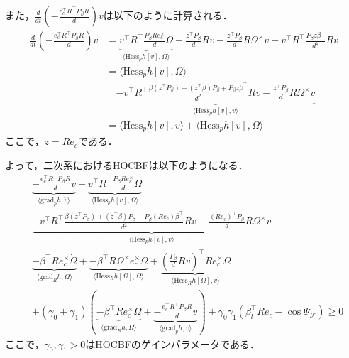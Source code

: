 また，$\frac{d}{dt} \left( -\frac{e_c^\top R^\top P_\beta R}{d} \right) v$は以下のように計算される．
\begin{equation}
\begin{aligned}
\frac{d}{dt} \left( -\frac{e_c^\top R^\top P_\beta R}{d} \right) v &= \underbrace{v^\top R^\top \frac{P_\beta R e_c^\times}{d} \Omega}_{\langle \mathrm{Hess}_p h[v], \Omega \rangle} - \frac{z^\top \dot{P}_\beta}{d} R v - \frac{z^\top P_\beta}{d} R \Omega^\times v - v^\top R^\top \frac{P_\beta z \beta^\top}{d^2} R v \\
&= \langle \mathrm{Hess}_p h[v], \Omega \rangle \\
&\quad \underbrace{-v^\top R^\top \frac{\beta (z^\top P_\beta) + (z^\top \beta) P_\beta + P_\beta z \beta^\top}{d^2} R v - \frac{z^\top P_\beta}{d} R \Omega^\times v}_{\langle \mathrm{Hess}_p h[v], v \rangle} \\
&= \langle \mathrm{Hess}_p h[v], v \rangle + \langle \mathrm{Hess}_p h[v], \Omega \rangle
\label{eq:hess_p_h_v_v}
\end{aligned}
\end{equation}
ここで，$z = R e_c$である．

よって，二次系におけるHOCBFは以下のようになる．
\begin{equation}
\begin{aligned}
&\underbrace{-\frac{e_c^\top R^\top P_\beta R}{d} \dot{v}}_{\langle \mathrm{grad}_p h, \dot{v} \rangle} + \underbrace{v^\top R^\top \frac{P_\beta R e_c^\times}{d} \Omega}_{\langle \mathrm{Hess}_p h[v], \Omega \rangle} \\
&\underbrace{-v^\top R^\top \frac{\beta (z^\top P_\beta) + (z^\top \beta) P_\beta + P_\beta (R e_c) \beta^\top}{d^2} R v - \frac{(R e_c)^\top P_\beta}{d} R \Omega^\times v}_{\langle \mathrm{Hess}_p h[v], v \rangle} \\
&\underbrace{-\beta^\top R e_c^\times \dot{\Omega}}_{\langle \mathrm{grad}_R h, \dot{\Omega} \rangle} + \underbrace{-\beta^\top R \Omega^\times e_c^\times \Omega}_{\langle \mathrm{Hess}_R h[\Omega], \Omega \rangle} + \underbrace{\left( \frac{P_\beta}{d} R v \right)^\top R e_c^\times \Omega}_{\langle \mathrm{Hess}_R h[\Omega], v \rangle} \\
&+ (\gamma_0 + \gamma_1) \left( \underbrace{-\beta^\top R e_c^\times \Omega}_{\langle \mathrm{grad}_R h, \Omega \rangle} + \underbrace{-\frac{e_c^\top R^\top P_\beta R}{d} v}_{\langle \mathrm{grad}_p h, v \rangle} \right) + \gamma_0 \gamma_1 (\beta_l^{\top} R e_c - \cos \Psi_\mathcal{F}) \geq 0
\label{eq:hocbf_constraint}
\end{aligned}
\end{equation}
ここで，$\gamma_0, \gamma_1 > 0$はHOCBFのゲインパラメータである．


